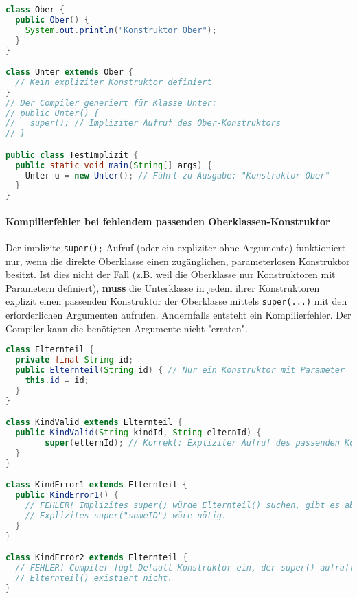 \begin{lstlisting}[language=Java, caption={Impliziter Konstruktor und \texttt{super()}-Aufruf durch den Compiler}]
class Ober {
  public Ober() {
    System.out.println("Konstruktor Ober");
  }
}

class Unter extends Ober {
  // Kein expliziter Konstruktor definiert
}
// Der Compiler generiert für Klasse Unter:
// public Unter() {
//   super(); // Impliziter Aufruf des Ober-Konstruktors
// }

public class TestImplizit {
  public static void main(String[] args) {
    Unter u = new Unter(); // Führt zu Ausgabe: "Konstruktor Ober"
  }
}
\end{lstlisting}

\paragraph{Kompilierfehler bei fehlendem passenden Oberklassen-Konstruktor}
Der implizite \texttt{super();}-Aufruf (oder ein expliziter ohne Argumente)
funktioniert nur, wenn die direkte Oberklasse einen zugänglichen,
parameterlosen Konstruktor besitzt. Ist dies nicht der Fall (z.B. weil die
Oberklasse nur Konstruktoren mit Parametern definiert), \textbf{muss} die
Unterklasse in jedem ihrer Konstruktoren explizit einen passenden Konstruktor
der Oberklasse mittels \texttt{super(...)} mit den erforderlichen Argumenten
aufrufen. Andernfalls entsteht ein Kompilierfehler. Der Compiler kann die
benötigten Argumente nicht "erraten".

\begin{lstlisting}[language=Java, caption={Kompilierfehler: \texttt{super()}-Aufruf scheitert bei parametrisiertem Superkonstruktor}]
class Elternteil {
  private final String id;
  public Elternteil(String id) { // Nur ein Konstruktor mit Parameter
    this.id = id;
  }
}

class KindValid extends Elternteil {
  public KindValid(String kindId, String elternId) {
        super(elternId); // Korrekt: Expliziter Aufruf des passenden Konstruktors
  }
}

class KindError1 extends Elternteil {
  public KindError1() {
    // FEHLER! Implizites super() würde Elternteil() suchen, gibt es aber nicht.
    // Explizites super("someID") wäre nötig.
  }
}

class KindError2 extends Elternteil {
  // FEHLER! Compiler fügt Default-Konstruktor ein, der super() aufruft.
  // Elternteil() existiert nicht.
}
\end{lstlisting}

